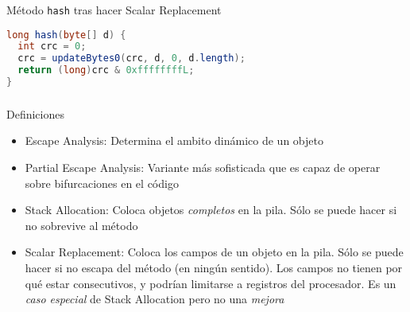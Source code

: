 \begin{frame}[fragile]
  \frametitle{\ft}
  \begin{block}{Método {\tt hash} tras hacer Scalar Replacement}
    \begin{lstlisting}[language=java]
long hash(byte[] d) {
  int crc = 0;
  crc = updateBytes0(crc, d, 0, d.length);
  return (long)crc & 0xffffffffL;
}
    \end{lstlisting}
  \end{block}
  \vskip1cm
\end{frame}


\begin{frame}[fragile]
  \frametitle{\ft}
  \begin{block}{Definiciones}
    \begin{itemize}
    \item Escape Analysis: Determina el ambito dinámico de un objeto
    \item Partial Escape Analysis: Variante más sofisticada que es capaz de
      operar sobre bifurcaciones en el código
    \item Stack Allocation: Coloca objetos {\it completos} en la pila.
      Sólo se puede hacer si no sobrevive al método
    \item Scalar Replacement: Coloca los campos de un objeto en la pila.
      Sólo se puede hacer si no escapa del método (en ningún sentido).
      Los campos no tienen por qué estar consecutivos, y podrían limitarse
      a registros del procesador.
      Es un {\it caso especial} de Stack Allocation pero no una {\it mejora}
    \end{itemize}
  \end{block}
\end{frame}


